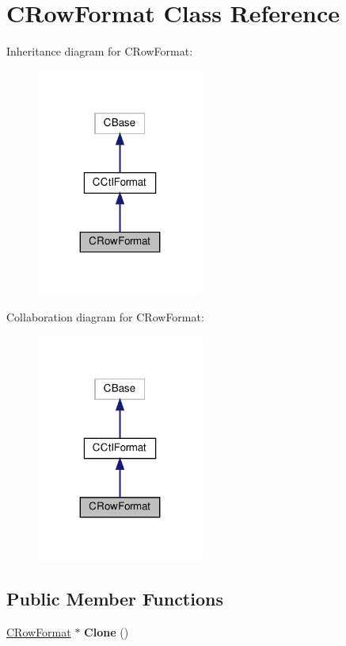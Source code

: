 \hypertarget{classCRowFormat}{}\section{C\+Row\+Format Class Reference}
\label{classCRowFormat}


Inheritance diagram for C\+Row\+Format\+:
\nopagebreak
\begin{figure}[H]
\begin{center}
\leavevmode
\includegraphics[width=155pt]{classCRowFormat__inherit__graph}
\end{center}
\end{figure}


Collaboration diagram for C\+Row\+Format\+:
\nopagebreak
\begin{figure}[H]
\begin{center}
\leavevmode
\includegraphics[width=155pt]{classCRowFormat__coll__graph}
\end{center}
\end{figure}
\subsection*{Public Member Functions}
\begin{DoxyCompactItemize}
\item 
\mbox{\label{classCRowFormat_ae9cd333223b8df70c1302c677fba1ddf}} 
\hyperlink{classCRowFormat}{C\+Row\+Format} $\ast$ {\bfseries Clone} ()
\end{DoxyCompactItemize}
